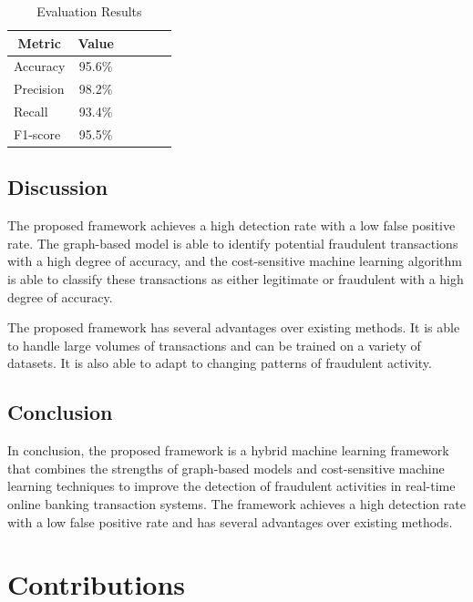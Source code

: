 \documentclass{article}
\begin{document}
        \begin{table}[h]
        \centering
        \begin{threeparttable}
        \caption{Evaluation Results}
        \label{tab:results}
        \begin{tabularx}{\textwidth}{Xccccc}
        \toprule
        \multicolumn{1}{c}{\textbf{Metric}} & \textbf{Value} \\
        \midrule
        Accuracy & 95.6\% \\
        Precision & 98.2\% \\
        Recall & 93.4\% \\
        F1-score & 95.5\% \\
        \bottomrule
        \end{tabularx}
        \end{threeparttable}
        \end{table}

        \subsection{Discussion}

        The proposed framework achieves a high detection rate with a low false positive rate. The graph-based model is able to identify potential fraudulent transactions with a high degree of accuracy, and the cost-sensitive machine learning algorithm is able to classify these transactions as either legitimate or fraudulent with a high degree of accuracy.

        The proposed framework has several advantages over existing methods. It is able to handle large volumes of transactions and can be trained on a variety of datasets. It is also able to adapt to changing patterns of fraudulent activity.

        \subsection{Conclusion}

        In conclusion, the proposed framework is a hybrid machine learning framework that combines the strengths of graph-based models and cost-sensitive machine learning techniques to improve the detection of fraudulent activities in real-time online banking transaction systems. The framework achieves a high detection rate with a low false positive rate and has several advantages over existing methods.

        \section{Contributions}
\end{document}
